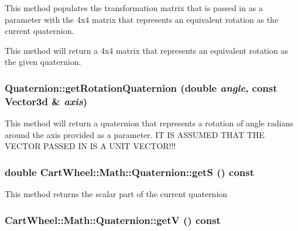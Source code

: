 \label{classCartWheel_1_1Math_1_1Quaternion_ad951159735ea47e13eb728424ffb64c2}
This method populates the transformation matrix that is passed in as a parameter with the 4x4 matrix that represents an equivalent rotation as the current quaternion.

This method will return a 4x4 matrix that represents an equivalent rotation as the given quaternion. \hypertarget{classCartWheel_1_1Math_1_1Quaternion_a299b7739b1f6ea90edfe5d67c9008b0a}{
\subsubsection[{getRotationQuaternion}]{ Quaternion::getRotationQuaternion (double {\em angle}, \/  const {\bf Vector3d} \& {\em axis})}}
\label{classCartWheel_1_1Math_1_1Quaternion_a299b7739b1f6ea90edfe5d67c9008b0a}
This method will return a quaternion that represents a rotation of angle radians around the axis provided as a parameter. IT IS ASSUMED THAT THE VECTOR PASSED IN IS A UNIT VECTOR!!! \hypertarget{classCartWheel_1_1Math_1_1Quaternion_a9d4adca20ef925eb7d6f8bdb1be46363}{
\subsubsection[{getS}]{\setlength{\rightskip}{0pt plus 5cm}double CartWheel::Math::Quaternion::getS () const}}
\label{classCartWheel_1_1Math_1_1Quaternion_a9d4adca20ef925eb7d6f8bdb1be46363}
This method returns the scalar part of the current quaternion \hypertarget{classCartWheel_1_1Math_1_1Quaternion_a1ce2ae630d5e8c7eae0c0fcb2e501ea3}{
\subsubsection[{getV}]{ CartWheel::Math::Quaternion::getV () const}}
